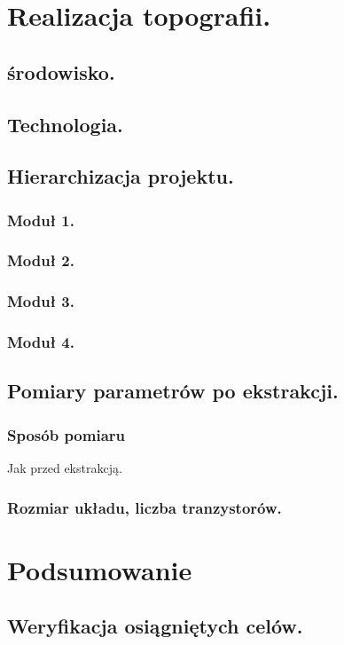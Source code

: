\documentclass[10pt,a4paper]{report}
\begin{document}
	\chapter{Realizacja topografii.}
	\section{środowisko.}
	\section{Technologia.}
	\section{Hierarchizacja projektu.}
	\subsection{Moduł 1.}
	\subsection{Moduł 2.}
	\subsection{Moduł 3.}
	\subsection{Moduł 4.}
	
	\section{Pomiary parametrów po ekstrakcji.}
	\subsection{Sposób pomiaru}
	Jak przed ekstrakcją.
	\subsection{Rozmiar układu, liczba tranzystorów.}

	\chapter{Podsumowanie}
	\section{Weryfikacja osiągniętych celów.}
	
\end{document}
